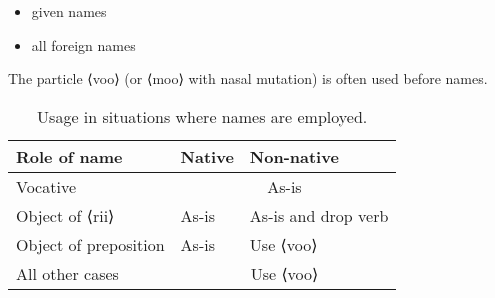 \documentclass{book}
\newcommand{\ortho}[1]{⟨#1⟩}
\begin{document}
\begin{itemize}
    \item given names
    \item all foreign names
\end{itemize}

The particle \ortho{voo} (or \ortho{moo} with nasal mutation) is often used before names.

\begin{table}[h]
    \caption{Usage in situations where names are employed.}
    \centering
    \begin{tabular}{|l|l|l|}
        \hline
        Role of name & Native & Non-native \\
        \hline
        Vocative & \multicolumn{2}{c|}{As-is} \\
        \hline
        Object of \ortho{rii} & As-is & As-is and drop verb \\
        \hline
        Object of preposition & As-is & Use \ortho{voo} \\
        \hline
        All other cases & \multicolumn{2}{c|}{Use \ortho{voo}} \\
        \hline
    \end{tabular}
\end{table}
\end{document}
